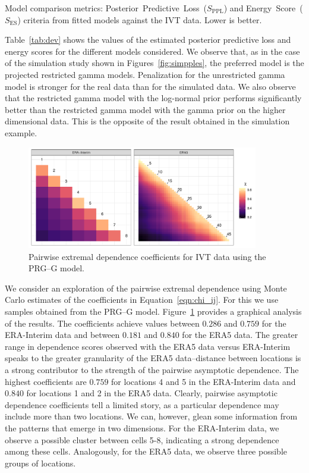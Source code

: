 \begin{table}[htb]
  \centering
  \caption{Model comparison metrics: Posterior~Predictive~Loss~($S_{\text{PPL}}$) and 
    Energy~Score~($S_{\text{ES}}$) criteria from fitted models against the IVT data.  
    Lower is better. \label{tab:dev}}
  
\end{table}

Table~\ref{tab:dev} shows the values of the estimated posterior predictive loss and energy scores for the different models considered. We observe that, as in the case of the simulation study shown in Figures~\ref{fig:simpples}, the preferred model is the projected restricted 
  gamma models.  Penalization for the unrestricted gamma model is 
  stronger for the real data than for the simulated data. We also observe that
  the restricted gamma model with the log-normal prior performs significantly better 
  than the restricted gamma model with the gamma prior on the higher dimensional data. This is the opposite of the result obtained in the simulation example.

\begin{figure}[ht]
    \centering
    \caption{Pairwise extremal dependence coefficients for IVT data using the PRG--G model.\label{fig:chi_ij}}
    \includegraphics[width=0.9\textwidth]{./images/chi_ij_c}
\end{figure}

We consider an exploration of the pairwise extremal dependence using Monte Carlo estimates of the 
  coefficients in  Equation~\ref{eqn:chi_ij}. For this we use samples obtained from the PRG--G model.
  Figure~\ref{fig:chi_ij} provides a graphical analysis of the results. 
  The coefficients achieve values between $0.286$ and $0.759$ for the ERA-Interim data and 
  between $0.181$ and $0.840$ for the ERA5 data.  The greater range in dependence scores observed 
  with the ERA5 data versus ERA-Interim speaks to the greater granularity of the ERA5 data--distance between locations is a strong contributor to the strength of the 
  pairwise asymptotic dependence. The highest coefficients are $0.759$ for 
  locations 4 and 5 in the ERA-Interim data and
  $0.840$ for locations 1 and 2 in the ERA5 data.  Clearly, pairwise asymptotic
  dependence coefficients tell a limited story, as a particular dependence may include
  more than two locations.   We can, however, glean some information from the patterns that
  emerge in two dimensions.  For the ERA-Interim data, we observe a possible cluster 
  between cells 5-8, indicating a strong dependence among these cells.  Analogously, for
  the ERA5 data, we observe three possible groups of locations.

